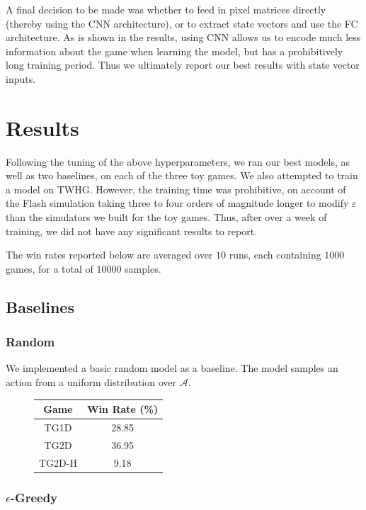 \documentclass[9pt,journal]{IEEEtran}
\begin{document}
A final decision to be made was whether to feed in pixel matrices directly (thereby using the CNN architecture), or to extract state vectors and use the FC architecture. As is shown in the results, using CNN allows us to encode much less information about the game when learning the model, but has a prohibitively long training period. Thus we ultimately report our best results with state vector inputs.

\section{Results}

Following the tuning of the above hyperparameters, we ran our best models, as well as two baselines, on each of the three toy games. We also attempted to train a model on TWHG. However, the training time was prohibitive, on account of the Flash simulation taking three to four orders of magnitude longer to modify $\varepsilon$ than the simulators we built for the toy games. Thus, after over a week of training, we did not have any significant results to report.

The win rates reported below are averaged over $10$ runs, each containing $1000$ games, for a total of $10000$ samples.

\subsection{Baselines}

\subsubsection{Random}

We implemented a basic random model as a baseline. The model samples an action from a uniform distribution over $\mathcal{A}$.

\begin{figure}[ht]
  \begin{tabular}{c | c}
    Game & Win Rate (\%) \\ \hline
    TG1D & 28.85 \\
    TG2D & 36.95 \\
    TG2D-H & 9.18 \\
  \end{tabular}
  \centering
\end{figure}

\subsubsection{\texorpdfstring{$\epsilon$-Greedy}{e-Greedy}}
\end{document}
